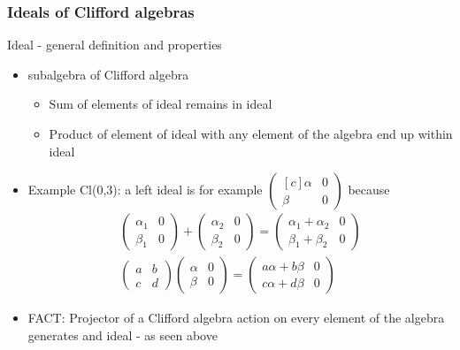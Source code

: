 \documentclass[../main.tex]{subfiles}
\begin{document}
\begin{itemize}
\subsubsection{Ideals of Clifford algebras}
Ideal - general definition and properties
\begin{itemize}
\item subalgebra of Clifford algebra
\begin{itemize}
\item Sum of elements of ideal remains in ideal
\item Product of element of ideal with any element of the algebra end up within ideal
\end{itemize}
\item Example Cl(0,3): a left ideal is for example $\left( 
\begin{smallmatrix*}[c]
    \alpha & 0 \\ 
    \beta  & 0 
\end{smallmatrix*} \right)$ because
\begin{align}
\left( 
\begin{matrix}
    \alpha_1 & 0 \\ 
    \beta_1  & 0 
\end{matrix} \right)
+
\left( 
\begin{matrix}
    \alpha_2 & 0 \\ 
    \beta_2  & 0 
\end{matrix} \right)
=
\left( 
\begin{matrix}
    \alpha_1+\alpha_2 & 0 \\ 
    \beta_1+\beta_2  & 0 
\end{matrix} \right)\\
\left( 
\begin{matrix}
    a & b \\ 
    c & d 
\end{matrix} \right)
\left( 
\begin{matrix}
    \alpha & 0 \\ 
    \beta  & 0 
\end{matrix} \right)
=
\left( 
\begin{matrix}
    a\alpha+b\beta & 0 \\ 
    c\alpha+d\beta  & 0 
\end{matrix} \right)
\end{align}
\item FACT: Projector of a Clifford algebra action on every element of the algebra generates and ideal - as seen above
\begin{align}

\end{align}
\end{itemize}
\end{itemize}
\end{document}
